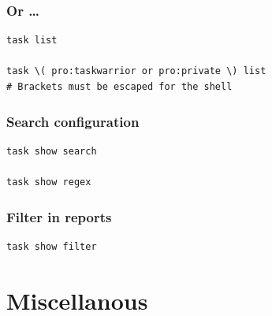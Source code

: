 \documentclass[t,handout]{beamer}
\begin{document}
\begin{frame}[fragile]\frametitle{Or \ldots}
    \vfill
    \begin{lstlisting}
task list

task \( pro:taskwarrior or pro:private \) list
# Brackets must be escaped for the shell
\end{lstlisting}
\end{frame}

\begin{frame}[fragile]\frametitle{Search configuration}
    \vfill
    \begin{lstlisting}
task show search

task show regex\end{lstlisting}
\end{frame}

\begin{frame}[fragile]\frametitle{Filter in reports}
    \vfill
    \begin{lstlisting}
task show filter\end{lstlisting}
\end{frame}

\section{Miscellanous}
\end{document}
